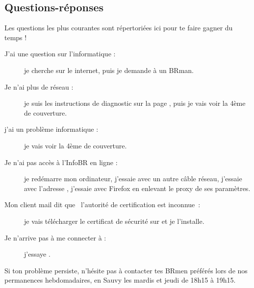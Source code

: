 \subsection{Questions-réponses}

Les questions les plus courantes sont répertoriées ici pour te faire gagner du temps !

\begin{description}

\item[J'ai une question sur l'informatique : ] je cherche sur le internet, puis je demande à un BRman.

\item[Je n'ai plus de réseau : ] je suis les instructions de diagnostic sur la page \pageref{diagnostic}, puis je vais voir la 4ème de couverture.

\item[j'ai un problème informatique : ] je vais voir la 4ème de couverture.

\item[Je n'ai pas accès à l'InfoBR en ligne : ] je redémarre mon ordinateur, j'essaie avec un autre câble réseau, j'essaie avec l'adresse , j'essaie avec Firefox en enlevant le proxy de ses paramètres.

\item[Mon client mail dit que \guillemotleft~l'autorité de certification est inconnue~\guillemotright : ] je vais télécharger le certificat de sécurité
sur  et je l'installe.


\item[Je n'arrive pas à me connecter à  : ] j'essaye .




\end{description}

Si ton problème persiste, n'hésite pas à contacter tes BRmen préférés lors de nos permanences hebdomadaires, en Sauvy les mardis et jeudi de 18h15 à 19h15.